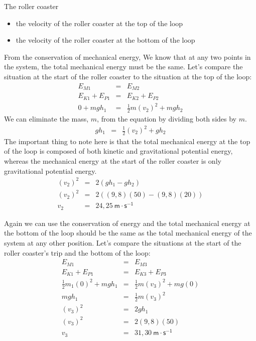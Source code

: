 \begin{wex}{The roller coaster}
{
\begin{itemize}
\item the velocity of the roller coaster at the top of the loop
\item the velocity of the roller coaster at the bottom of the loop
\end{itemize}

From the conservation of mechanical energy, We know that at any two points in the system, the total mechanical energy must be the same. Let's compare the situation at the start of the roller coaster to the situation at the top of the loop:
\begin{eqnarray*}
E_{M1} & = & E_{M2} \\
E_{K1} + E_{P1} & = & E_{K2} + E_{P2} \\
0 + mgh_{1} &=& \frac{1}{2}m(v_{2})^2 + mgh_{2} 
\end{eqnarray*}
We can eliminate the mass, $m$, from the equation by dividing both sides by $m$.
\begin{eqnarray*}
gh_{1} &=&  \frac{1}{2}(v_{2})^2 + gh_{2} 
\end{eqnarray*}
The important thing to note here is that the total mechanical energy at the top of the loop is composed of both kinetic and gravitational potential energy, whereas the mechanical energy at the start of the roller coaster is only gravitational potential energy. 
\begin{eqnarray*}
(v_{2})^2 &=& 2(gh_{1} - gh_{2}) \\
(v_{2})^2 &=& 2((9,8)(50) - (9,8)(20)) \\
v_{2} &=& 24,25 \ \mathsf{m\cdot s^{-1}}
\end{eqnarray*}

Again we can use the conservation of energy and the total mechanical energy at the bottom of the loop should be the same as the total mechanical energy of the system at any other position. 
Let's compare the situations at the start of the roller coaster's trip and the bottom of the loop:
\begin{eqnarray*}
E_{M1} & = & E_{M3} \\
E_{K1} + E_{P1} & = & E_{K3} + E_{P3} \\
\frac{1}{2}m_{1}(0)^2 + mgh_{1} &=& \frac{1}{2}m(v_{3})^2 + mg(0) \\
mgh_{1} &=&  \frac{1}{2}m(v_{3})^2 \\
(v_3)^2 &=& 2gh_1 \\
(v_3)^2 &=& 2(9,8)(50) \\
v_3 &=& 31,30 \ \mathsf{m \cdot s^{-1}}
\end{eqnarray*}

}
\end{wex}


